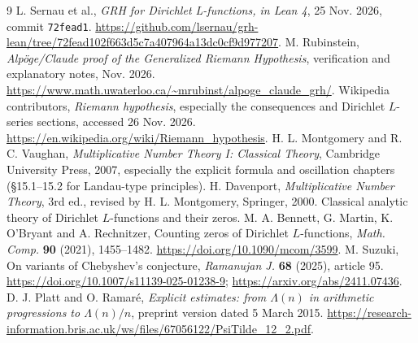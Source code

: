 \documentclass[11pt]{article}
\theoremstyle{remark}\newtheorem{remark}[theorem]{Remark}
\begin{document}
\begin{thebibliography}{9}\small
{} L. Sernau et al., \emph{GRH for Dirichlet L-functions, in Lean 4}, 25 Nov. 2026, commit \texttt{72fead1}. \url{https://github.com/lsernau/grh-lean/tree/72fead102f663d5c7a407964a13dc0cf9d977207}.
 M. Rubinstein, \emph{Alp\"oge/Claude proof of the Generalized Riemann Hypothesis}, verification and explanatory notes, Nov. 2026. \url{https://www.math.uwaterloo.ca/~mrubinst/alpoge_claude_grh/}.
 Wikipedia contributors, \emph{Riemann hypothesis}, especially the consequences and Dirichlet $L$-series sections, accessed 26 Nov. 2026. \url{https://en.wikipedia.org/wiki/Riemann_hypothesis}.
 H. L. Montgomery and R. C. Vaughan, \emph{Multiplicative Number Theory I: Classical Theory}, Cambridge University Press, 2007, especially the explicit formula and oscillation chapters (\S15.1--15.2 for Landau-type principles).
 H. Davenport, \emph{Multiplicative Number Theory}, 3rd ed., revised by H. L. Montgomery, Springer, 2000. Classical analytic theory of Dirichlet $L$-functions and their zeros.
 M. A. Bennett, G. Martin, K. O'Bryant and A. Rechnitzer, Counting zeros of Dirichlet $L$-functions, \emph{Math. Comp.} \textbf{90} (2021), 1455--1482. \url{https://doi.org/10.1090/mcom/3599}.
 M. Suzuki, On variants of Chebyshev's conjecture, \emph{Ramanujan J.} \textbf{68} (2025), article 95. \url{https://doi.org/10.1007/s11139-025-01238-9}; \url{https://arxiv.org/abs/2411.07436}.
 D. J. Platt and O. Ramar\'e, \emph{Explicit estimates: from $\Lambda(n)$ in arithmetic progressions to $\Lambda(n)/n$}, preprint version dated 5 March 2015. \url{https://research-information.bris.ac.uk/ws/files/67056122/PsiTilde_12_2.pdf}.
\end{thebibliography}
\end{document}
